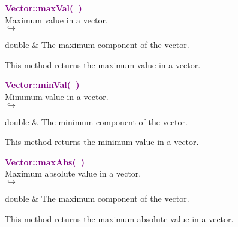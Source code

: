 \textcolor{purple}{\textbf{Vector::maxVal(~)}}\label{Vector::maxVal()}\\
Maximum value in a vector.\\ \hspace*{5mm}$\hookrightarrow$
\vspace*{-2em}\begin{tcolorbox}[grow to left by=-1cm, width=\textwidth-1cm,myArgs,tabularx={l|R}]
double & The maximum component of the vector.
\end{tcolorbox}

This method returns the maximum value in a vector.

\textcolor{purple}{\textbf{Vector::minVal(~)}}\label{Vector::minVal()}\\
Minumum value in a vector.\\ \hspace*{5mm}$\hookrightarrow$
\vspace*{-2em}\begin{tcolorbox}[grow to left by=-1cm, width=\textwidth-1cm,myArgs,tabularx={l|R}]
double & The minimum component of the vector.
\end{tcolorbox}

This method returns the minimum value in a vector.

\textcolor{purple}{\textbf{Vector::maxAbs(~)}}\label{Vector::maxAbs()}\\
Maximum absolute value in a vector.\\ \hspace*{5mm}$\hookrightarrow$
\vspace*{-2em}\begin{tcolorbox}[grow to left by=-1cm, width=\textwidth-1cm,myArgs,tabularx={l|R}]
double & The maximum component of the vector.
\end{tcolorbox}

This method returns the maximum absolute value in a vector.

